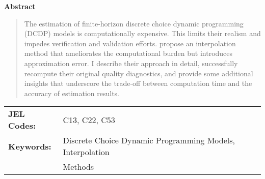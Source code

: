 \maketitle



\setcounter{page}{1}
\thispagestyle{empty}

\vspace{-0.5cm}
\begin{center}\textbf{Abstract}\end{center}
\begin{abstract}\onehalfspacing
\noindent The estimation of finite-horizon discrete choice dynamic programming (DCDP) models is computationally expensive. This limits their realism and impedes verification and validation efforts. \citet{Keane.1994} propose an interpolation method that ameliorates the computational burden but introduces approximation error. I describe their approach in detail, successfully recompute their original quality diagnostics, and provide some additional insights that underscore the trade-off between computation time and the accuracy of estimation results.\\\newline
\end{abstract}

\noindent\begin{tabular}{@{\hspace{0.5cm}}ll}
\textbf{JEL Codes:} & C13, C22, C53 \\
\textbf{Keywords:} & Discrete Choice Dynamic Programming Models, Interpolation \\
                   & Methods
\end{tabular}\newpage
